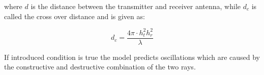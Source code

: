 where $d$ is the distance between the transmitter and receiver antenna, while $d_{c}$ is called the cross over distance and is given as:

\begin{equation}
d_{c} = \frac{4\pi \cdot h^2_t h^2_r }{\lambda}
\label{two_ray_cross_dis}
\end{equation}  


If introduced condition is true the model predicts oscillations which are caused by the constructive and destructive combination of the two rays.








